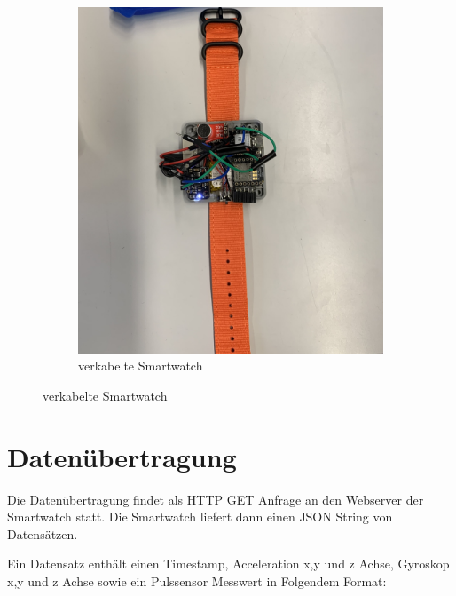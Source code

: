 \documentclass[a4paper, 11pt]{article}
\begin{document}
\begin{figure}[H]
\begin{subfigure}{0.49\textwidth}
        \includegraphics[width=\textwidth]{images/verkabelte_Smartwatch.JPEG}
        \caption{verkabelte Smartwatch}
        \label{fig:verkabelte Smartwatch}
    \end{subfigure}
\end{figure}

\clearpage

\section{Datenübertragung}
Die Datenübertragung findet als HTTP GET Anfrage an den Webserver der Smartwatch statt. Die Smartwatch liefert dann einen JSON String von Datensätzen.

\noindent
Ein Datensatz enthält einen Timestamp, Acceleration x,y und z Achse, Gyroskop x,y und z Achse sowie ein Pulssensor Messwert in Folgendem Format:

\clearpage
\end{document}
